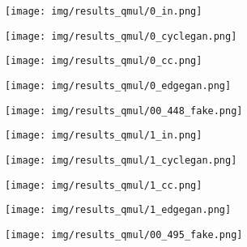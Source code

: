 \documentclass[10pt,twocolumn,letterpaper]{article}
\begin{document}
\newcommand{\qmulwidth}{0.18} 
\begin{figure}[htbp]
\captionsetup[subfigure]{labelformat=empty}
\begin{center}
  \begin{subfigure}[b]{\qmulwidth\linewidth}
  \texttt{[image: img/results\_qmul/0\_in.png]}
  \end{subfigure}
  \begin{subfigure}[b]{\qmulwidth\linewidth}
  \texttt{[image: img/results\_qmul/0\_cyclegan.png]}
  \end{subfigure}
  \begin{subfigure}[b]{\qmulwidth\linewidth}
  \texttt{[image: img/results\_qmul/0\_cc.png]}
  \end{subfigure}
   \begin{subfigure}[b]{\qmulwidth\linewidth}
  \texttt{[image: img/results\_qmul/0\_edgegan.png]}
  \end{subfigure}
  \begin{subfigure}[b]{\qmulwidth\linewidth}
  \texttt{[image: img/results\_qmul/00\_448\_fake.png]}
  \end{subfigure}
  
\begin{subfigure}[b]{\qmulwidth\linewidth}
  \texttt{[image: img/results\_qmul/1\_in.png]}
  \end{subfigure}
  \begin{subfigure}[b]{\qmulwidth\linewidth}
  \texttt{[image: img/results\_qmul/1\_cyclegan.png]}
  \end{subfigure}
  \begin{subfigure}[b]{\qmulwidth\linewidth}
  \texttt{[image: img/results\_qmul/1\_cc.png]}
  \end{subfigure} 
   \begin{subfigure}[b]{\qmulwidth\linewidth}
  \texttt{[image: img/results\_qmul/1\_edgegan.png]}
  \end{subfigure}
  \begin{subfigure}[b]{\qmulwidth\linewidth}
  \texttt{[image: img/results\_qmul/00\_495\_fake.png]}
  \end{subfigure}
  

\end{center}
\end{figure}
\end{document}
